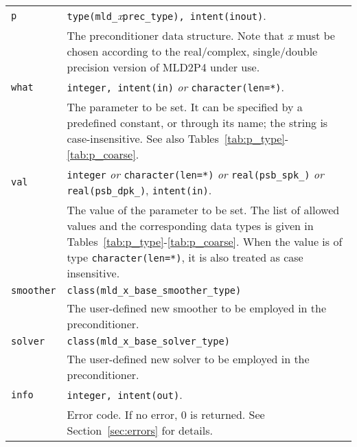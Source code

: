 \begin{tabular}{p{1.2cm}p{12cm}}
\verb|p|      & \verb|type(mld_|\emph{x}\verb|prec_type), intent(inout)|.\\
              & The preconditioner data structure. Note that \emph{x} must
                be chosen according to the real/complex, single/double precision
                 version of MLD2P4 under use.\\
\verb|what|   & \verb|integer, intent(in)| \emph{or} \verb|character(len=*)|. \\
              & The parameter to be set. It can be specified by 
                a predefined constant, or through its name; the string
                is case-insensitive. See also
                Tables~\ref{tab:p_type}-\ref{tab:p_coarse}.\\ 
\verb|val |   & \verb|integer| \emph{or} \verb|character(len=*)| \emph{or}
                \verb|real(psb_spk_)| \emph{or} \verb|real(psb_dpk_)|,
                \verb|intent(in)|.\\
              & The value of the parameter to be set. The list of allowed
                values and the corresponding data types is given in
                Tables~\ref{tab:p_type}-\ref{tab:p_coarse}.
                When the value is of type \verb|character(len=*)|,
                it is also treated as case insensitive.\\
\verb|smoother| & \verb|class(mld_x_base_smoother_type)| \\
              & The user-defined new smoother to be employed in the
                preconditioner.\\

\verb|solver| & \verb|class(mld_x_base_solver_type)| \\
              & The user-defined new solver to be employed in the
                preconditioner.\\

\verb|info|   & \verb|integer, intent(out)|.\\
              & Error code. If no error, 0 is returned. See Section~\ref{sec:errors}
                for details.\\
%
\end{tabular}

